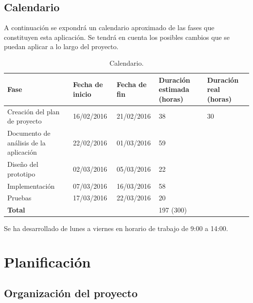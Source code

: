 \documentclass[a4paper,11pt, twoside]{article}
\begin{document}
\subsection{Calendario}
A continuación se expondrá un calendario aproximado de las fases que constituyen esta aplicación. Se tendrá en cuenta los posibles cambios que se puedan aplicar a lo largo del proyecto.
\begin{table}[!h]
 \centering
\begin{tabular}{|M{2.65cm}|M{2.65cm}|M{2.65cm}|M{2.65cm}|M{2.65cm}|}
 \hline
 \textbf{\large Fase} & \textbf{\large Fecha de inicio} & \textbf{\large Fecha de fin} & \textbf{\large Duración estimada (horas) } & \textbf{\large Duración real (horas)} \\\hline
    Creación del plan de proyecto & 16/02/2016 & 21/02/2016 & 38 & 30 \\
        \hline
        Documento de análisis de la aplicación & 22/02/2016 & 01/03/2016 & 59 &  \\
        \hline
        Diseño del prototipo & 02/03/2016 & 05/03/2016 & 22 &  \\
        \hline
        Implementación & 07/03/2016 & 16/03/2016 & 58 &  \\
        \hline
        Pruebas & 17/03/2016 & 22/03/2016 & 20 &  \\
        \hline
        \textbf{\large Total} & {\large}  &{\large} & {\large 197 (300) } & {\large} \\
        \hline
\end{tabular}
        \caption{Calendario.}
		\label{ta:cal}
\end{table}

Se ha desarrollado de lunes a viernes en horario de trabajo de 9:00 a 14:00.

\section{Planificación}
\subsection{Organización del proyecto}
\end{document}
